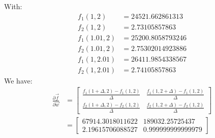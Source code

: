 With:
\begin{align*}
    f_1(1,2) &= 24521.662861313 \\
    f_2(1,2) &= 2.73105857863 \\
    f_1(1.01,2) &= 25200.8058793246 \\
    f_2(1.01,2) &= 2.75302014923886 \\
    f_1(1,2.01) &= 26411.9854338567 \\
    f_2(1,2.01) &= 2.74105857863
\end{align*}
We have:
\begin{align*}
    \frac{\partial \vec{f}}{\partial \vec{w}} &=
    \begin{bmatrix}
        \frac{f_1(1 + \Delta,2) - f_1(1,2)}{\Delta} & \frac{f_1(1,2 + \Delta) - f_1(1,2)}{\Delta} \\
        \frac{f_2(1 + \Delta,2) - f_2(1,2)}{\Delta} & \frac{f_2(1,2 + \Delta) - f_2(1,2)}{\Delta}
    \end{bmatrix} \\
    &=
    \begin{bmatrix}
        67914.3018011622 & 189032.25725437 \\
        2.19615706088527 & 0.999999999999979
    \end{bmatrix} \\
\end{align*}



